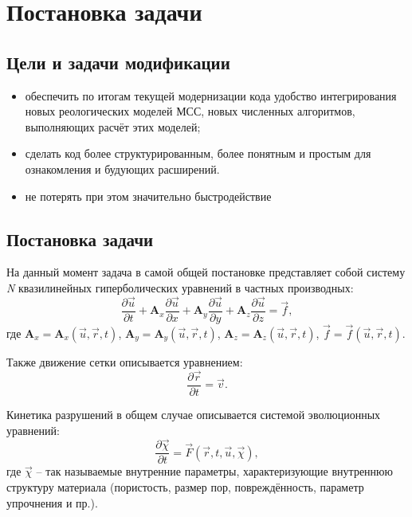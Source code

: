 \documentclass[a4paper,12pt]{article}
\numberwithin{equation}{section}
\begin{document}
\section{Постановка задачи}

\subsection{Цели и задачи модификации}	
	\begin{itemize}
		\item{обеспечить по итогам текущей модернизации кода удобство интегрирования новых 	реологических моделей МСС, новых численных алгоритмов, выполняющих расчёт этих моделей;}
		\item{сделать код более структурированным, более понятным и простым для ознакомления и будующих расширений.}
		\item{не потерять при этом значительно быстродействие}
	\end{itemize}
	
\subsection{Постановка задачи}

	На данный момент задача в самой общей постановке представляет собой систему \textit{N} квазилинейных гиперболических уравнений в частных производных:
\begin{equation}
	\label{main_equation}
	\frac{\partial\vec{u}}{\partial{t}}+\mathbf{A}_x\frac{\partial\vec{u}}{\partial{x}}+
	\mathbf{A}_y\frac{\partial\vec{u}}{\partial{y}}+
	\mathbf{A}_z\frac{\partial\vec{u}}{\partial{z}}=\vec{f},
\end{equation}
	где $\mathbf{A}_x = \mathbf{A}_x(\vec{u}, \vec{r}, t)$, $\mathbf{A}_y = \mathbf{A}_y(\vec{u}, \vec{r}, t)$, $\mathbf{A}_z = \mathbf{A}_z(\vec{u}, \vec{r}, t)$, $\vec{f} = \vec{f}(\vec{u}, \vec{r}, t)$.
	
	Также движение сетки описывается уравнением:
\begin{equation}
	\label{mesh_movement_equation}
	\frac{\partial\vec{r}}{\partial{t}}=\vec{v}.
\end{equation}	
	
	Кинетика разрушений в общем случае описывается системой эволюционных уравнений:
\begin{equation}
	\label{failure_equations}
	\frac{\partial{\vec{\chi}}}{\partial{t}}=\vec{F}(\vec{r}, t, \vec{u}, \vec{\chi}),
\end{equation}		
	где $\vec{\chi}$ -- так называемые внутренние параметры, характеризующие внутреннюю структуру материала (пористость, размер пор, повреждённость, параметр упрочнения и пр.).
	
\end{document}
